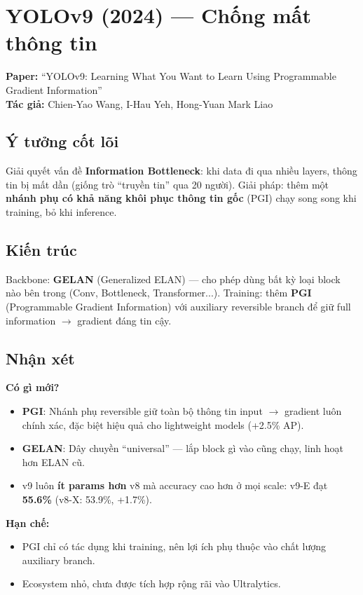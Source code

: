 \documentclass[12pt,a4paper]{report}
\begin{document}
\section{YOLOv9 (2024) --- Chống mất thông tin}
\textbf{Paper:} ``YOLOv9: Learning What You Want to Learn Using Programmable Gradient Information''\\
\textbf{Tác giả:} Chien-Yao Wang, I-Hau Yeh, Hong-Yuan Mark Liao

\subsection{Ý tưởng cốt lõi}
Giải quyết vấn đề \textbf{Information Bottleneck}: khi data đi qua nhiều layers, thông tin bị mất dần (giống trò ``truyền tin'' qua 20 người). Giải pháp: thêm một \textbf{nhánh phụ có khả năng khôi phục thông tin gốc} (PGI) chạy song song khi training, bỏ khi inference.

\subsection{Kiến trúc}
Backbone: \textbf{GELAN} (Generalized ELAN) --- cho phép dùng bất kỳ loại block nào bên trong (Conv, Bottleneck, Transformer...). Training: thêm \textbf{PGI} (Programmable Gradient Information) với auxiliary reversible branch để giữ full information $\rightarrow$ gradient đáng tin cậy.

\subsection{Nhận xét}

\textbf{Có gì mới?}
\begin{itemize}
    \item \textbf{PGI}: Nhánh phụ reversible giữ toàn bộ thông tin input $\rightarrow$ gradient luôn chính xác, đặc biệt hiệu quả cho lightweight models (+2.5\% AP).
    \item \textbf{GELAN}: Dây chuyền ``universal'' --- lắp block gì vào cũng chạy, linh hoạt hơn ELAN cũ.
    \item v9 luôn \textbf{ít params hơn} v8 mà accuracy cao hơn ở mọi scale: v9-E đạt \textbf{55.6\%} (v8-X: 53.9\%, +1.7\%).
\end{itemize}

\textbf{Hạn chế:}
\begin{itemize}
    \item PGI chỉ có tác dụng khi training, nên lợi ích phụ thuộc vào chất lượng auxiliary branch.
    \item Ecosystem nhỏ, chưa được tích hợp rộng rãi vào Ultralytics.
\end{itemize}
\end{document}
